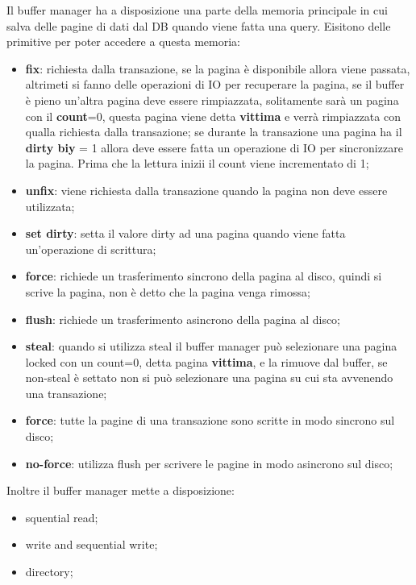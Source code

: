 \documentclass[12pt]{article}
\begin{document}
Il buffer manager ha a disposizione una parte della memoria principale in cui salva delle pagine di dati dal DB quando viene fatta una query. Eisitono delle primitive per poter accedere a questa memoria:
\begin{itemize}
    \item \textbf{fix}: richiesta dalla transazione, se la pagina \`e disponibile allora viene passata, altrimeti si fanno delle operazioni di IO per recuperare la pagina, se il buffer \`e pieno un'altra pagina deve essere rimpiazzata, solitamente sar\`a un pagina con il \textbf{count}=0, questa pagina viene detta \textbf{vittima} e verr\`a rimpiazzata con qualla richiesta dalla transazione; se durante la transazione una pagina ha il \textbf{dirty biy} = 1 allora deve essere fatta un operazione di IO per sincronizzare la pagina. Prima che la lettura inizii il count viene incrementato di 1;
    \item \textbf{unfix}: viene richiesta dalla transazione quando la pagina non deve essere utilizzata;
    \item \textbf{set dirty}: setta il valore dirty ad una pagina quando viene fatta un'operazione di scrittura;
    \item \textbf{force}: richiede un trasferimento sincrono della pagina al disco, quindi si scrive la pagina, non \`e detto che la pagina venga rimossa;
    \item \textbf{flush}: richiede un trasferimento asincrono della pagina al disco;
    \item \textbf{steal}: quando si utilizza steal il buffer manager pu\`o selezionare una pagina locked con un count=0, detta pagina \textbf{vittima}, e la rimuove dal buffer, se non-steal \`e settato non si pu\`o selezionare una pagina su cui sta avvenendo una transazione;
    \item \textbf{force}: tutte la pagine di una transazione sono scritte in modo sincrono sul disco;
    \item \textbf{no-force}: utilizza flush per scrivere le pagine in modo asincrono sul disco;
\end{itemize}
Inoltre il buffer manager mette a disposizione:
\begin{itemize}
    \item squential read;
    \item write and sequential write;
    \item directory;
\end{itemize}
\end{document}
